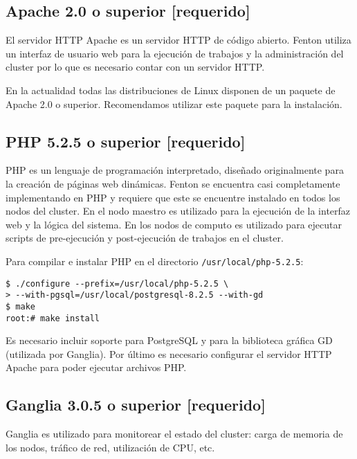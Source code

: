 \documentclass[a4paper,10pt,spanish]{article}
\begin{document}
\subsection{Apache 2.0 o superior \small{[requerido]}}

El servidor HTTP Apache\cite{apache} es un servidor HTTP de c\'{o}digo abierto. Fenton utiliza un interfaz de usuario web para la ejecuci\'{o}n de trabajos y la administraci\'{o}n del cluster por lo que es necesario contar con un servidor HTTP.

En la actualidad todas las distribuciones de Linux disponen de un paquete de Apache 2.0 o superior. Recomendamos utilizar este paquete para la instalaci\'{o}n.

\subsection{PHP 5.2.5 o superior \small{[requerido]}}

PHP\cite{php} es un lenguaje de programaci\'{o}n interpretado, dise\~{n}ado originalmente para la creaci\'{o}n de p\'{a}ginas web din\'{a}micas. Fenton se encuentra casi completamente implementando en PHP y requiere que este se encuentre instalado en todos los nodos del cluster. En el nodo maestro es utilizado para la ejecuci\'{o}n de la interfaz web y la l\'{o}gica del sistema. En los nodos de computo es utilizado para ejecutar scripts de pre-ejecuci\'{o}n y post-ejecuci\'{o}n de trabajos en el cluster.

Para compilar e instalar PHP en el directorio \mbox{\texttt{/usr/local/php-5.2.5}}:

\begin{verbatim}
$ ./configure --prefix=/usr/local/php-5.2.5 \
> --with-pgsql=/usr/local/postgresql-8.2.5 --with-gd 
$ make 
root:# make install
\end{verbatim}

Es necesario incluir soporte para PostgreSQL y para la biblioteca gr\'{a}fica GD (utilizada por Ganglia). Por \'{u}ltimo es necesario configurar el servidor HTTP Apache para poder ejecutar archivos PHP.

\subsection{Ganglia 3.0.5 o superior \small{[requerido]}}

Ganglia es utilizado para monitorear el estado del cluster: carga de memoria de los nodos, tr\'{a}fico de red, utilizaci\'{o}n de CPU, etc. 
\end{document}
